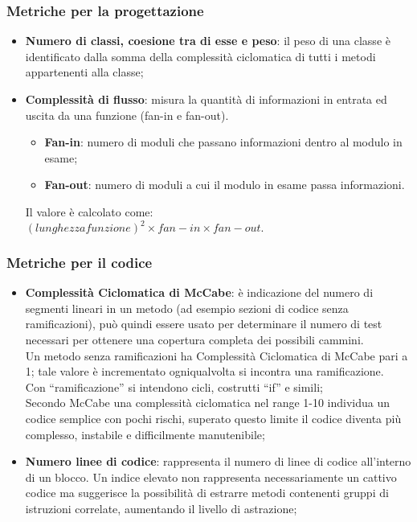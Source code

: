 {\subsubsection{Metriche per la progettazione}{
	\begin{itemize}
		\item \textbf{Numero di classi, coesione tra di esse e peso}: il peso di una classe è identificato dalla somma della complessità ciclomatica di tutti i metodi appartenenti alla classe;
	 	\item \textbf{Complessità di flusso}: misura la quantità di informazioni in	entrata ed uscita da una funzione (fan-in e fan-out).\\
	 	\begin{itemize}
	 	 \item \textbf{Fan-in}: numero di moduli che passano informazioni dentro al modulo in esame;
	 	 \item \textbf{Fan-out}: numero di moduli a cui il modulo in esame passa informazioni.
	 	\end{itemize}
	 	Il valore è calcolato come:\\
	 	$(lunghezzafunzione)^2\times fan-in \times fan-out.$
	\end{itemize}
\subsubsection{Metriche per il codice}{
	\begin{itemize}
		\item \textbf{Complessità Ciclomatica di McCabe}: è indicazione del numero di segmenti lineari in un metodo (ad esempio sezioni di codice senza ramificazioni), può quindi essere usato per determinare il numero di test necessari per ottenere una copertura completa dei possibili cammini.  \\
		Un metodo senza ramificazioni ha Complessità Ciclomatica di McCabe pari a 1; tale valore è incrementato ogniqualvolta si incontra una ramificazione.  \\
		Con “ramificazione” si intendono cicli, costrutti “if” e simili;\\
		Secondo McCabe una complessità ciclomatica nel range 1-10 individua un codice semplice con pochi rischi, superato questo limite il codice diventa più complesso, instabile e difficilmente manutenibile;
		
		\item \textbf{Numero linee di codice}: rappresenta il numero di linee di codice all'interno di un blocco. 
		Un indice elevato non rappresenta necessariamente un cattivo codice ma suggerisce la possibilità di estrarre metodi contenenti gruppi di istruzioni correlate, aumentando il livello di astrazione;
		

\end{itemize}}}}
